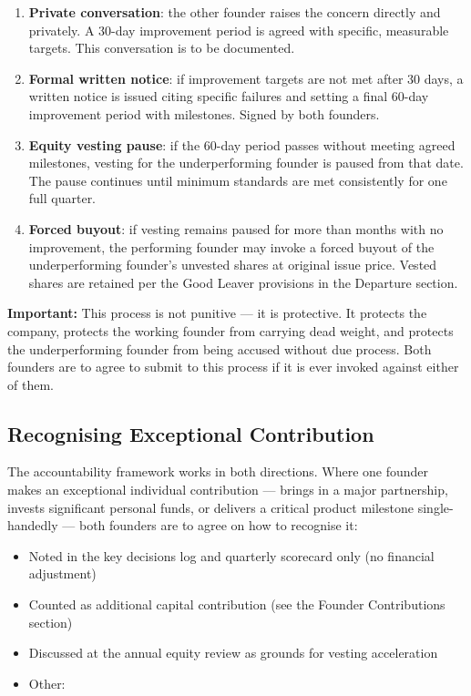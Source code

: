 \documentclass[12pt,a4paper]{article}
\newcommand{\blank}[1][5.5cm]{\underline{\hspace{#1}}}
\newcommand{\cb}{$\square$\;}                   %
\begin{document}
\begin{enumerate}
  \item \textbf{Private conversation}: the other founder raises the concern directly and privately. A 30-day improvement period is agreed with specific, measurable targets. This conversation is to be documented.
  \item \textbf{Formal written notice}: if improvement targets are not met after 30 days, a written notice is issued citing specific failures and setting a final 60-day improvement period with milestones. Signed by both founders.
  \item \textbf{Equity vesting pause}: if the 60-day period passes without meeting agreed milestones, vesting for the underperforming founder is paused from that date. The pause continues until minimum standards are met consistently for one full quarter.
  \item \textbf{Forced buyout}: if vesting remains paused for more than \blank[2cm] months with no improvement, the performing founder may invoke a forced buyout of the underperforming founder's unvested shares at original issue price. Vested shares are retained per the Good Leaver provisions in the Departure section.
\end{enumerate}

\begin{warnbox}
\textbf{Important:} This process is not punitive --- it is protective. It protects the company, protects the working founder from carrying dead weight, and protects the underperforming founder from being accused without due process. Both founders are to agree to submit to this process if it is ever invoked against either of them.
\end{warnbox}

\subsection{Recognising Exceptional Contribution}

The accountability framework works in both directions. Where one founder makes an exceptional individual contribution --- brings in a major partnership, invests significant personal funds, or delivers a critical product milestone single-handedly --- both founders are to agree on how to recognise it:

\begin{itemize}[label=\cb]
  \item Noted in the key decisions log and quarterly scorecard only (no financial adjustment)
  \item Counted as additional capital contribution (see the Founder Contributions section)
  \item Discussed at the annual equity review as grounds for vesting acceleration
  \item Other: \blank[7cm]
\end{itemize}
\end{document}
